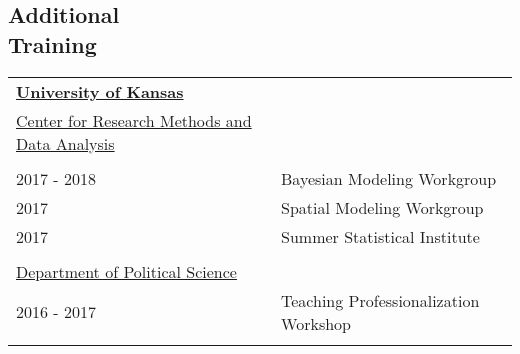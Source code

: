 \documentclass[margin,line,pifont,palatino,courier]{res}
\begin{document}
\begin{resume}


\section{\sc Additional\\ Training}

\begin{tabular}{ll}
  \textbf{\underline{University of Kansas}} &\\
  \underline{Center for Research Methods and Data Analysis} &\\
  \\
  2017 - 2018 & Bayesian Modeling Workgroup \\
  2017 & Spatial Modeling Workgroup\\
  2017 & Summer Statistical Institute\\
  \\
  \underline{Department of Political Science}\\
  2016 - 2017 & Teaching Professionalization Workshop\\
  \\
\end{tabular}




\end{resume}
\end{document}
